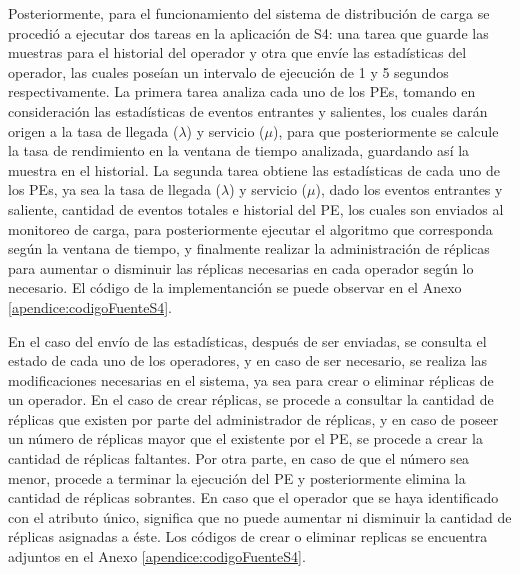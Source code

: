 Posteriormente, para el funcionamiento del sistema de distribución de carga se procedió a ejecutar dos tareas en la aplicación de S4: una tarea que guarde las muestras para el historial del operador y otra que envíe las estadísticas del operador, las cuales poseían un intervalo de ejecución de 1 y 5 segundos respectivamente. La primera tarea analiza cada uno de los PEs, tomando en consideración las estadísticas de eventos entrantes y salientes, los cuales darán origen a la tasa de llegada ($\lambda$) y servicio ($\mu$), para que posteriormente se calcule la tasa de rendimiento en la ventana de tiempo analizada, guardando así la muestra en el historial. La segunda tarea obtiene las estadísticas de cada uno de los PEs, ya sea la tasa de llegada ($\lambda$) y servicio ($\mu$), dado los eventos entrantes y saliente, cantidad de eventos totales e historial del PE, los cuales son enviados al monitoreo de carga, para posteriormente ejecutar el algoritmo que corresponda según la ventana de tiempo, y finalmente realizar la administración de réplicas para aumentar o disminuir las réplicas necesarias en cada operador según lo necesario. El código de la implementanción se puede observar en el Anexo \ref{apendice:codigoFuenteS4}.


En el caso del envío de las estadísticas, después de ser enviadas, se consulta el estado de cada uno de los operadores, y en caso de ser necesario, se realiza las modificaciones necesarias en el sistema, ya sea para crear o eliminar réplicas de un operador. En el caso de crear réplicas, se procede a consultar la cantidad de réplicas que existen por parte del administrador de réplicas, y en caso de poseer un número de réplicas mayor que el existente por el PE, se procede a crear la cantidad de réplicas faltantes. Por otra parte, en caso de que el número sea menor, procede a terminar la ejecución del PE y posteriormente elimina la cantidad de réplicas sobrantes. En caso que el operador que se haya identificado con el atributo único, significa que no puede aumentar ni disminuir la cantidad de réplicas asignadas a éste. Los códigos de crear o eliminar replicas se encuentra adjuntos en el Anexo \ref{apendice:codigoFuenteS4}.

